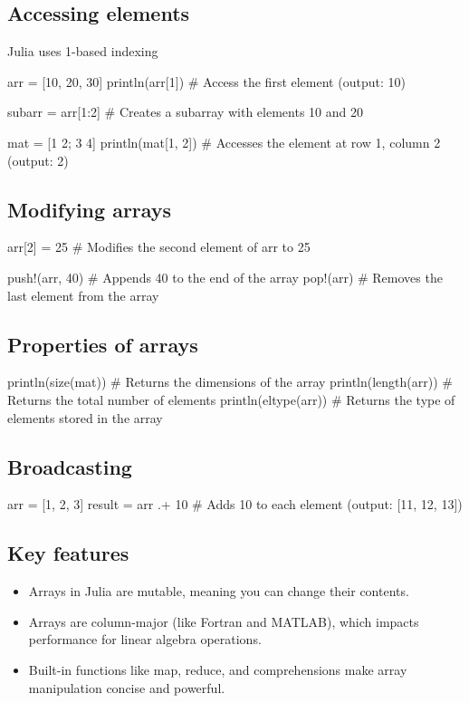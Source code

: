 \documentclass{report}
\begin{document}
    \subsection{Accessing elements}
    \bigbreak \noindent 
    Julia uses 1-based indexing
    \bigbreak \noindent 
    \begin{jlcode}
    arr = [10, 20, 30]
    println(arr[1])  # Access the first element (output: 10)

    subarr = arr[1:2]  # Creates a subarray with elements 10 and 20

    mat = [1 2; 3 4]
    println(mat[1, 2])  # Accesses the element at row 1, column 2 (output: 2)
    \end{jlcode}

    \bigbreak \noindent 
    \subsection{Modifying arrays}
    \bigbreak \noindent 
    \begin{jlcode}
    arr[2] = 25  # Modifies the second element of arr to 25

    push!(arr, 40)  # Appends 40 to the end of the array
    pop!(arr)  # Removes the last element from the array
    \end{jlcode}

    \bigbreak \noindent 
    \subsection{Properties of arrays}
    \bigbreak \noindent 
    \begin{jlcode}
    println(size(mat))  # Returns the dimensions of the array
    println(length(arr))  # Returns the total number of elements
    println(eltype(arr))  # Returns the type of elements stored in the array
    \end{jlcode}

    \bigbreak \noindent 
    \subsection{Broadcasting}
    \bigbreak \noindent 
    \begin{jlcode}
    arr = [1, 2, 3]
    result = arr .+ 10  # Adds 10 to each element (output: [11, 12, 13])
    \end{jlcode}

    \bigbreak \noindent 
    \subsection{Key features}
    \begin{itemize}
        \item Arrays in Julia are mutable, meaning you can change their contents.
        \item Arrays are column-major (like Fortran and MATLAB), which impacts performance for linear algebra operations.
        \item Built-in functions like map, reduce, and comprehensions make array manipulation concise and powerful.
    \end{itemize}
\end{document}
